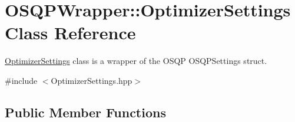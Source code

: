 \section{O\+S\+Q\+P\+Wrapper\+:\+:Optimizer\+Settings Class Reference}
\label{classOSQPWrapper_1_1OptimizerSettings}


\hyperlink{classOSQPWrapper_1_1OptimizerSettings}{Optimizer\+Settings} class is a wrapper of the O\+S\+QP O\+S\+Q\+P\+Settings struct.  




{\ttfamily \#include $<$Optimizer\+Settings.\+hpp$>$}

\subsection*{Public Member Functions}
